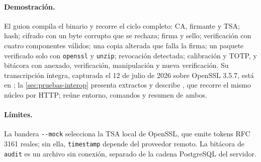 \paragraph{Demostración.} El guion  compila el binario y recorre el ciclo completo: CA, firmante y TSA; hash; cifrado con un byte corrupto que se rechaza; firma y sello; verificación con cuatro componentes válidos; una copia alterada que falla la firma; un paquete verificado solo con \texttt{openssl} y \texttt{unzip}; revocación detectada; calibración y TOTP, y bitácora con anexado, verificación, manipulación y nueva verificación. Su transcripción íntegra, capturada el 12 de julio de 2026 sobre OpenSSL 3.5.7, está en ; la \cref{sec:pruebas-interop} presenta extractos y describe , que recorre el mismo núcleo por HTTP;  reúne entorno, comandos y resumen de ambos.

\paragraph{Límites.} La bandera \texttt{-{}-mock} selecciona la TSA local de OpenSSL, que emite tokens RFC 3161 reales; sin ella, \texttt{timestamp} depende del proveedor remoto. La bitácora de \texttt{audit} es un archivo sin conexión, separado de la cadena PostgreSQL del servidor.

